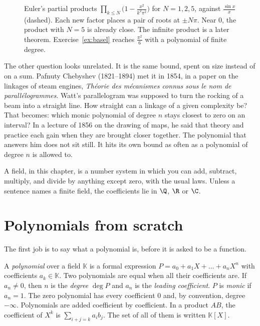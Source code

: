 \begin{figure}[ht]
\centering
{}
\caption{Euler's partial products $\prod_{k\le N}\bigl(1-\frac{x^2}{k^2\pi^2}\bigr)$ for $N=1,2,5$, against $\frac{\sin x}x$ (dashed). Each new factor places a pair of roots at $\pm N\pi$. Near $0$, the product with $N=5$ is already close. The infinite product is a later theorem. Exercise~\ref{ex:basel} reaches $\frac{\pi^2}6$ with a polynomial of finite degree.}
\label{fig:sineprod}
\end{figure}

The other question looks unrelated. It is the same bound, spent on size instead of on a sum. Pafnuty Chebyshev (1821--1894) met it in 1854, in a paper on the linkages of steam engines, \emph{Th\'eorie des m\'ecanismes connus sous le nom de parall\'elogrammes}. Watt's parallelogram was supposed to turn the rocking of a beam into a straight line. How straight can a linkage of a given complexity be? That becomes: which monic polynomial of degree $n$ stays closest to zero on an interval? In a lecture of 1856 on the drawing of maps, he said that theory and practice each gain when they are brought closer together. The polynomial that answers him does not sit still. It hits its own bound as often as a polynomial of degree $n$ is allowed to.


A field, in this chapter, is a number system in which you can add, subtract, multiply, and divide by anything except zero, with the usual laws. Unless a sentence names a finite field, the coefficients lie in $\Q$, $\R$ or $\C$.

\section{Polynomials from scratch}

The first job is to say what a polynomial is, before it is asked to be a function.

\begin{definitionx}
A \emph{polynomial} over a field $\mathbb K$ is a formal expression $P=a_0+a_1X+\dots+a_nX^n$ with coefficients $a_k\in\mathbb K$. Two polynomials are equal when all their coefficients are. If $a_n\ne0$, then $n$ is the \emph{degree} $\deg P$ and $a_n$ is the \emph{leading coefficient}. $P$ is \emph{monic} if $a_n=1$. The zero polynomial has every coefficient $0$ and, by convention, degree $-\infty$. Polynomials are added coefficient by coefficient. In a product $AB$, the coefficient of $X^k$ is $\sum_{i+j=k}a_ib_j$. The set of all of them is written $\mathbb K[X]$.
\end{definitionx}

